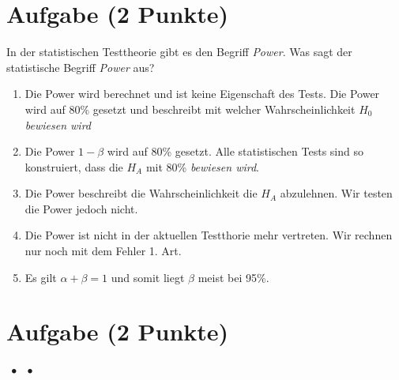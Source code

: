 \documentclass[a4paper, 9pt]{scrartcl}\usepackage[]{graphicx}\usepackage[]{xcolor}
\begin{document}
{\section{Aufgabe \hfill (2 Punkte)}

\ifcollection
\begin{flushright}
\tiny\vspace{-2Ex}
\textbf{\examinhaltstart}
\exammodulebiostat
\vspace{-1Ex}
\end{flushright}
\fi




In der statistischen Testtheorie gibt es den Begriff \textit{Power}. Was sagt der statistische Begriff \textit{Power} aus?



\begin{enumerate}
\item [\textbf{A} \msquare] Die Power wird berechnet und ist keine Eigenschaft des Tests. Die Power wird auf $80\%$ gesetzt und beschreibt mit welcher Wahrscheinlichkeit $H_0$ \textit{bewiesen wird}
\item [\textbf{B} \msquare] Die Power $1-\beta$ wird auf 80\% gesetzt. Alle statistischen Tests sind so konstruiert, dass die $H_A$ mit 80\% \textit{bewiesen wird}.
\item [\textbf{C} \msquare] Die Power beschreibt die Wahrscheinlichkeit die $H_A$ abzulehnen. Wir testen die Power jedoch nicht.
\item [\textbf{D} \msquare] Die Power ist nicht in der aktuellen Testthorie mehr vertreten. Wir rechnen nur noch mit dem Fehler 1. Art.
\item [\textbf{E} \msquare] Es gilt $\alpha + \beta = 1$ und somit liegt $\beta$ meist bei 95\%.
\end{enumerate} 

\section{Aufgabe \hfill (2 Punkte)}

\ifcollection
\begin{flushright}
\tiny\vspace{-2Ex}
\textbf{\examinhaltstart}
\exammodulemathstat $\;\bullet$
\exammodulestat $\;\bullet$
\exammodulestatbbv 
\vspace{-1Ex}
\end{flushright}
\fi




}
\end{document}
